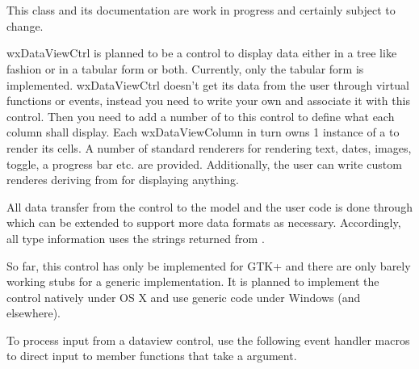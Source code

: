 
\section{}\label{wxdataviewctrl}

This class and its documentation are work in progress and
certainly subject to change.

wxDataViewCtrl is planned to be a control to display data either
in a tree like fashion or in a tabular form or both. Currently,
only the tabular form is implemented. wxDataViewCtrl doesn't
get its data from the user through virtual functions or events,
instead you need to write your own 
 and associate
it with this control. Then you need to add a number of
 to this control to
define what each column shall display. Each wxDataViewColumn
in turn owns 1 instance of a 
 to render its
cells. A number of standard renderers for rendering text, dates,
images, toggle, a progress bar etc. are provided. Additionally,
the user can write custom renderes deriving from 
for displaying anything.

All data transfer from the control to the model and the user
code is done through  which can
be extended to support more data formats as necessary. 
Accordingly, all type information uses the strings returned
from .

So far, this control has only be implemented for GTK+ and
there are only barely working stubs for a generic implementation.
It is planned to implement the control natively under OS X
and use generic code under Windows (and elsewhere).


\twocolwidtha{5cm}
\begin{twocollist}\itemsep=0pt
\end{twocollist}



To process input from a dataview control, use the following event handler
macros to direct input to member functions that take a 
 argument.

